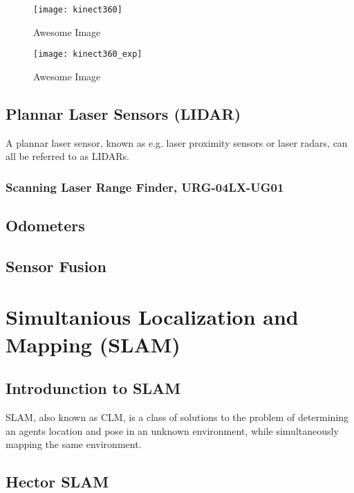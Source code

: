 \begin{figure}[p]
    \centering
    \texttt{[image: kinect360]}
    \caption{Awesome Image}
    \label{fig:kinect360}
\end{figure}

\begin{figure}[p]
    \centering
    \texttt{[image: kinect360\_exp]}
    \caption{Awesome Image}
    \label{fig:kinect360_exp}
\end{figure}


\subsection{Plannar Laser Sensors (LIDAR)}

A plannar laser sensor, known as e.g. laser proximity sensors or laser radars, can all be referred to as LIDARs. 

\subsubsection{Scanning Laser Range Finder, URG-04LX-UG01}


\subsection{Odometers}

\subsection{Sensor Fusion}


\section{Simultanious Localization and Mapping (SLAM)}

\subsection{Introdunction to SLAM}

\ac{SLAM}, also known as \ac{CLM}, is a class of solutions to the problem of determining an agents location and pose in an unknown environment, while simultaneously mapping the same environment.

\subsection{Hector SLAM}

